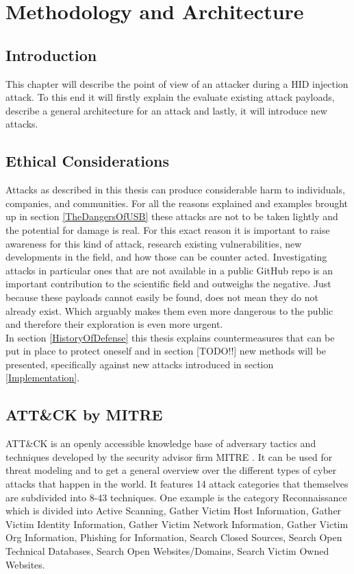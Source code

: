 \chapter{Methodology and Architecture} \label{Methodology}

\section{Introduction}

This chapter will describe the point of view of an attacker during a HID injection attack. To this end it will firstly explain the evaluate existing attack payloads, describe a general architecture for an attack and lastly, it will introduce new attacks. 


\section{Ethical Considerations}
Attacks as described in this thesis can produce considerable harm to individuals, companies, and communities. For all the reasons explained and examples brought up in section \ref{TheDangersOfUSB} these attacks are not to be taken lightly and the potential for damage is real. For this exact reason it is important to raise awareness for this kind of attack, research existing vulnerabilities, new developments in the field, and how those can be counter acted. Investigating attacks in particular ones that are not available in a public GitHub repo is an important contribution to the scientific field and outweighs the negative. Just because these payloads cannot easily be found, does not mean they do not already exist. Which arguably makes them even more dangerous to the public and therefore their exploration is even more urgent. \\
In section \ref{HistoryOfDefense} this thesis explains countermeasures that can be put in place to protect oneself and in section [TODO!!] new methods will be presented, specifically against new attacks introduced in section \ref{Implementation}.


\section{ATT\&CK by MITRE}

ATT\&CK \cite{MITREATTCK} is an openly accessible knowledge base of adversary tactics and techniques developed by the security advisor firm MITRE \cite{WhoWeAre}. It can be used for threat modeling and to get a general overview over the different types of cyber attacks that happen in the world.
It features 14 attack categories that themselves are subdivided into 8-43 techniques. One example is the category Reconnaissance which is divided into Active Scanning, Gather Victim Host Information, Gather Victim Identity Information, Gather Victim Network Information, Gather Victim Org Information, Phishing for Information, Search Closed Sources, Search Open Technical Databases, Search Open Websites/Domains, Search Victim Owned Websites. 



